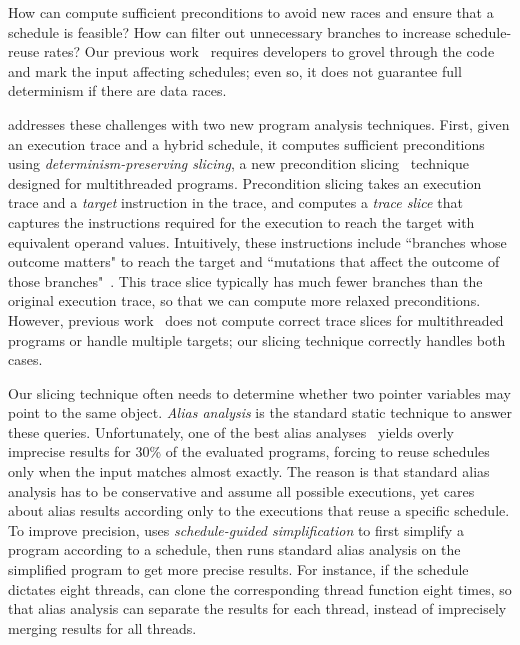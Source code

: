 How can \peregrine compute sufficient preconditions to avoid new races and
ensure that a schedule is feasible?  How can \peregrine filter out unnecessary
branches to increase schedule-reuse rates?  Our previous
work~\cite{cui:tern:osdi10} requires developers to grovel through the
code and mark the input affecting schedules; even so, it does not
guarantee full determinism if there are data races.

\peregrine addresses these challenges with two new
program analysis techniques.  First, given an execution trace and a hybrid
schedule, it computes sufficient preconditions using
\emph{determinism-preserving slicing}, a new precondition
slicing~\cite{castro:bouncer} technique designed for multithreaded
programs.  Precondition slicing takes an execution trace and a
\emph{target} instruction in the trace, and computes 
a \emph{trace slice} that captures the instructions required for the
execution to reach the target with equivalent operand
values.  Intuitively, these instructions include ``branches whose
  outcome matters" to reach the target and ``mutations that affect the
  outcome of those branches"~\cite{castro:bouncer}.  This trace slice
typically has much fewer branches than the original execution trace,
so that we can compute more relaxed preconditions.  However, previous
work~\cite{castro:bouncer} does not compute correct trace slices for
multithreaded programs or handle multiple targets; our slicing
technique correctly handles both cases.

Our slicing technique often needs to determine whether two pointer
variables may point to the same object.  \emph{Alias
  analysis} is the standard static technique to answer these queries.
Unfortunately, one of the best alias analyses~\cite{bddalias:pldi04} yields
overly
imprecise results for 30\% of the evaluated programs, forcing \peregrine to
reuse
schedules only when the input matches almost exactly.  The reason is that
standard
alias analysis has to be conservative and assume all possible executions,
yet \peregrine cares about alias results
according only to the executions that reuse a specific schedule.  To
improve precision, \peregrine uses \emph{schedule-guided simplification} to
first simplify a program according to a schedule, then runs standard alias
analysis on the simplified program to get more precise results.  For
instance, if the schedule dictates eight threads, \peregrine can clone
the corresponding thread function eight times, so that alias analysis can
separate the results for each thread, instead of imprecisely merging
results for all threads.

